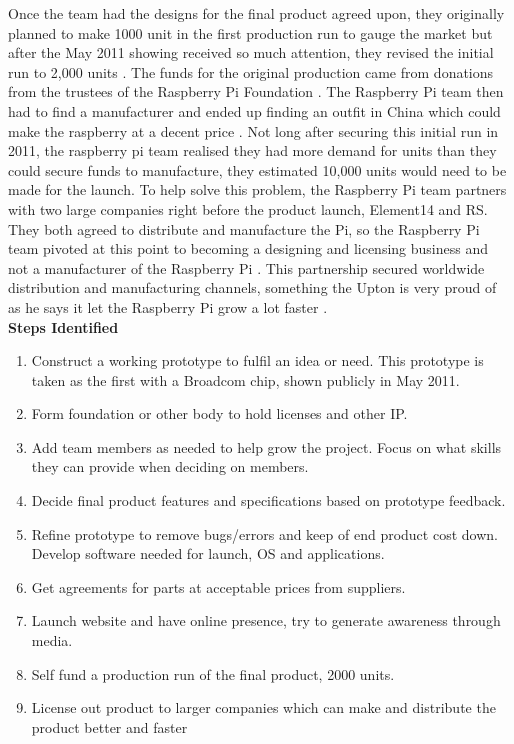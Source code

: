 Once the team had the designs for the final product agreed upon, they originally planned to make 1000 unit in the first production run to gauge the market
\cite{RN139} but after the May 2011 showing received so much attention, they revised the initial run to 2,000 units 
\cite{RN98}. The funds for the original production came from donations from the trustees of the Raspberry Pi Foundation 
\cite{RN142}. The Raspberry Pi team then had to find a manufacturer and ended up finding an outfit in China which could make the raspberry at a decent price 
\cite{RN98}. Not long after securing this initial run in 2011, the raspberry pi team realised they had more demand for units than they could secure funds to manufacture, they estimated 10,000 units would need to be made for the launch. To help solve this problem, the Raspberry Pi team partners with two large companies right before the product launch, Element14 and RS. They both agreed to distribute and manufacture the Pi, so the Raspberry Pi team pivoted at this point to becoming a designing and licensing business and not a manufacturer of the Raspberry Pi 
\cite{RN98}. This partnership secured worldwide distribution and manufacturing channels, something the Upton is very proud of as he says it let the Raspberry Pi grow a lot faster 
\cite{RN98}.\\

\textbf{Steps Identified}
\begin{enumerate}
\item Construct a working prototype to fulfil an idea or need. This prototype is taken as the first with a Broadcom chip, shown publicly in May 2011.
\item Form foundation or other body to hold licenses and other IP.
\item Add team members as needed to help grow the project. Focus on what skills they can provide when deciding on members.
\item Decide final product features and specifications based on prototype feedback.
\item Refine prototype to remove bugs/errors and keep of end product cost down. Develop software needed for launch, OS and applications.
\item Get agreements for parts at acceptable prices from suppliers.
\item Launch website and have online presence, try to generate awareness through media.
\item Self fund a production run of the final product, 2000 units.
\item License out product to larger companies which can make and distribute the product better and faster
\end{enumerate} 
 
